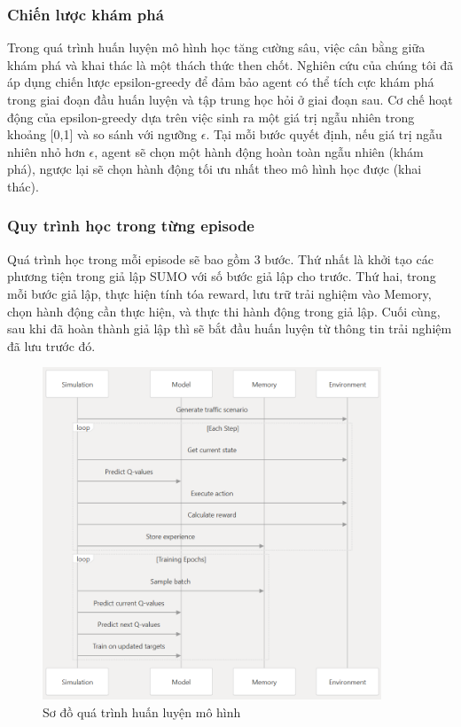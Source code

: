 \subsubsection{Chiến lược khám phá}
Trong quá trình huấn luyện mô hình học tăng cường sâu, việc cân bằng giữa khám phá và khai thác là một thách thức then chốt. Nghiên cứu của chúng tôi đã áp dụng chiến lược epsilon-greedy để đảm bảo agent có thể tích cực khám phá trong giai đoạn đầu huấn luyện và tập trung học hỏi ở giai đoạn sau. Cơ chế hoạt động của epsilon-greedy dựa trên việc sinh ra một giá trị ngẫu nhiên trong khoảng [0,1] và so sánh với ngưỡng  $\epsilon$. Tại mỗi bước quyết định, nếu giá trị ngẫu nhiên nhỏ hơn $\epsilon$, agent sẽ chọn một hành động hoàn toàn ngẫu nhiên (khám phá), ngược lại sẽ chọn hành động tối ưu nhất theo mô hình học được (khai thác).

\subsubsection{Quy trình học trong từng episode}
Quá trình học trong mỗi episode sẽ bao gồm 3 bước. Thứ nhất là khởi tạo các phương tiện trong giả lập SUMO với số bước giả lập cho trước. Thứ hai, trong mỗi bước giả lập, thực hiện tính tóa reward, lưu trữ trải nghiệm vào Memory, chọn hành động cần thực hiện, và thực thi hành động trong giả lập. Cuối cùng, sau khi đã hoàn thành giả lập thì sẽ bắt đầu huấn luyện từ thông tin trải nghiệm đã lưu trước đó.
\begin{figure}[!htp]
    \centering
    \includegraphics[width=0.9\textwidth]{img/training_episode.png}
    \caption{Sơ đồ quá trình huấn luyện mô hình}
    \label{fig:training_flow}
\end{figure}

